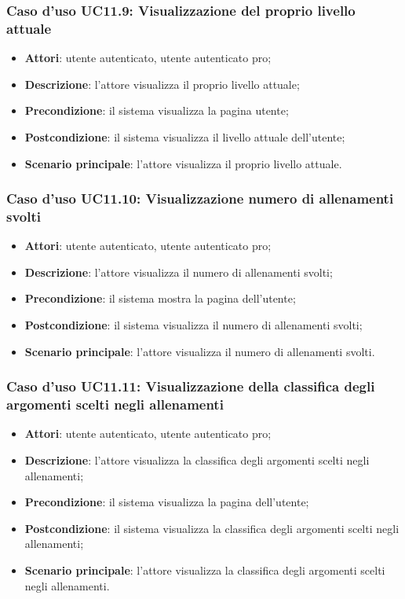 \subsubsection{Caso d'uso UC11.9: Visualizzazione del proprio livello attuale }
\begin{itemize}
	\item\textbf{Attori}: utente autenticato, utente autenticato pro;
	\item\textbf{Descrizione}: l'attore visualizza il proprio livello attuale;
	\item\textbf{Precondizione}: il sistema visualizza la pagina utente;
	\item\textbf{Postcondizione}: il sistema visualizza il livello attuale dell'utente;
	\item\textbf{Scenario principale}: l'attore visualizza il proprio livello attuale.
\end{itemize}

\subsubsection{Caso d'uso UC11.10: Visualizzazione numero di allenamenti svolti}
\begin{itemize}
	\item\textbf{Attori}: utente autenticato, utente autenticato pro;
	\item\textbf{Descrizione}: l'attore visualizza il numero di allenamenti svolti;
	\item\textbf{Precondizione}: il sistema mostra la pagina dell'utente;
	\item\textbf{Postcondizione}: il sistema visualizza il numero di allenamenti svolti;
	\item\textbf{Scenario principale}: l'attore visualizza il numero di allenamenti svolti.
\end{itemize}

\subsubsection{Caso d'uso UC11.11: Visualizzazione della classifica degli argomenti scelti negli allenamenti }
\begin{itemize}
	\item\textbf{Attori}: utente autenticato, utente autenticato pro;
	\item\textbf{Descrizione}: l'attore visualizza la classifica degli argomenti scelti negli allenamenti;
	\item\textbf{Precondizione}: il sistema visualizza la pagina dell'utente;
	\item\textbf{Postcondizione}: il sistema visualizza la classifica degli argomenti scelti negli allenamenti;
	\item\textbf{Scenario principale}: l'attore visualizza la classifica degli argomenti scelti negli allenamenti.
\end{itemize}

